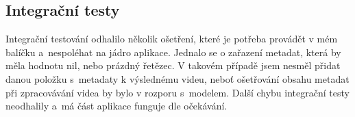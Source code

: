 \subsection{Integrační testy}
\par Integrační testování odhalilo několik ošetření, které je potřeba provádět v mém balíčku a~nespoléhat na jádro aplikace. Jednalo se o zařazení metadat, která by měla hodnotu nil, nebo prázdný řetězec. V takovém případě jsem nesměl přidat danou položku s~metadaty k výslednému videu, neboť ošetřování obsahu metadat při zpracovávání videa by bylo v rozporu s~modelem. Další chybu integrační testy neodhalily a~má část aplikace funguje dle očekávání.